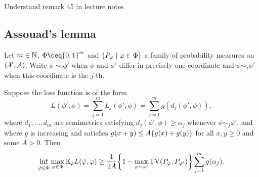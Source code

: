 \begin{example}
	\TODO Understand remark 45 in lecture notes
\end{example}

\subsection{Assouad's lemma}
\begin{lemma}
	Let $m \in \mathbb N$, $\Phi \ceq \qty{0, 1}^m$ and $\qty{P_\varphi\mid \varphi\in \Phi}$ a family of probability measures on $(\mathcal X, \mathcal A)$. Write $\phi \sim \phi'$ when $\phi$ and $\phi'$ differ in precisely one coordinate and $\phi \sim_j \phi'$ when this coordinate is the $j$-th. 
	
	Suppose the loss function is of the form 
	\[
	L(\phi', \phi) = \sum_{j=1}^m L_j(\phi', \phi) = \sum_{j=1}^m g(d_j(\phi', \phi)), 
	\]
	where $d_1, \dotsc, d_m$ are semimetrics satisfying $d_j(\phi', \phi) \geq\alpha_j$ whenever $\phi \sim_j \phi'$, and where $g$ is increasing and  satisfies $g(x+y) \leq A\qty{g(x) + g(y)}$ for all $x, y \geq 0$ and some $A > 0$. Then
	\[
	\inf_{\hat{\varphi} \in \hat\Phi} \max_{\varphi\in\Phi} \mathbb E_\varphi L(\hat{\varphi},\varphi) \geq \frac1{2A} \qty{1 - \max_{\varphi\sim \varphi'} \operatorname{TV}(P_\varphi, P_{\varphi'})} \sum_{j=1}^m g(\alpha_j). 
	\]
	
\end{lemma}

